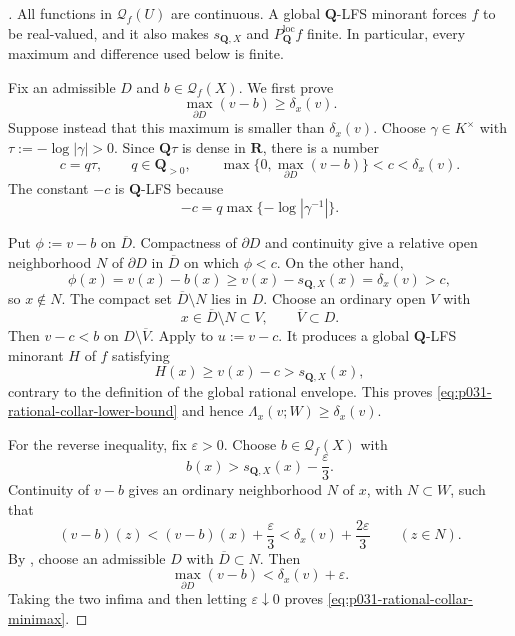 \begin{proof}[]
All functions in $\mathcal Q_f(U)$ are continuous.  A global
$\mathbf Q$-LFS minorant forces $f$ to be real-valued, and it also makes
$s_{\mathbf Q,X}$ and $P_{\mathbf Q}^{\mathrm{loc}}f$ finite.  In
particular, every maximum and difference used below is finite.

Fix an admissible $D$ and $b\in\mathcal Q_f(X)$.  We first prove
\begin{equation}
\label{eq:p031-rational-collar-lower-bound}
                       \max_{\partial D}(v-b)\geq\delta_x(v).
\end{equation}
Suppose instead that this maximum is smaller than $\delta_x(v)$.  Choose
$\gamma\in K^\times$ with $\tau:=-\log|\gamma|>0$.  Since
$\mathbf Q\tau$ is dense in $\mathbf R$, there is a number
\begin{equation}
\label{eq:p031-rational-collar-shift-choice}
 c=q\tau,\qquad q\in\mathbf Q_{>0},\qquad
 \max\bigl\{0,\max_{\partial D}(v-b)\bigr\}<c<\delta_x(v).
\end{equation}
The constant $-c$ is $\mathbf Q$-LFS because
\[
                   -c=q\max\{-\log|\gamma^{-1}|\}.
\]

Put $\phi:=v-b$ on $\overline D$.  Compactness of $\partial D$ and
continuity give a relative open neighborhood $N$ of $\partial D$ in
$\overline D$ on which $\phi<c$.  On the other hand,
\[
 \phi(x)=v(x)-b(x)\geq v(x)-s_{\mathbf Q,X}(x)
                         =\delta_x(v)>c,
\]
so $x\notin N$.  The compact set $\overline D\setminus N$ lies in $D$.
Choose an ordinary open $V$ with
\[
 x\in\overline D\setminus N\subset V,
                    \qquad\overline V\subset D.
\]
Then $v-c<b$ on $D\setminus\overline V$.  Apply
 to $u:=v-c$.  It produces
a global $\mathbf Q$-LFS minorant $H$ of $f$ satisfying
\[
                    H(x)\geq v(x)-c>s_{\mathbf Q,X}(x),
\]
contrary to the definition of the global rational envelope.  This proves
\eqref{eq:p031-rational-collar-lower-bound} and hence
$\Lambda_x(v;W)\geq\delta_x(v)$.

For the reverse inequality, fix $\varepsilon>0$.  Choose
$b\in\mathcal Q_f(X)$ with
\[
                 b(x)>s_{\mathbf Q,X}(x)-\frac{\varepsilon}{3}.
\]
Continuity of $v-b$ gives an ordinary neighborhood $N$ of $x$, with
$N\subset W$, such that
\[
 (v-b)(z)<(v-b)(x)+\frac{\varepsilon}{3}
       <\delta_x(v)+\frac{2\varepsilon}{3}
                  \qquad(z\in N).
\]
By , choose an admissible
$D$ with $\overline D\subset N$.  Then
\[
                  \max_{\partial D}(v-b)
                       <\delta_x(v)+\varepsilon.
\]
Taking the two infima and then letting $\varepsilon\downarrow0$ proves
\eqref{eq:p031-rational-collar-minimax}.


\end{proof}
